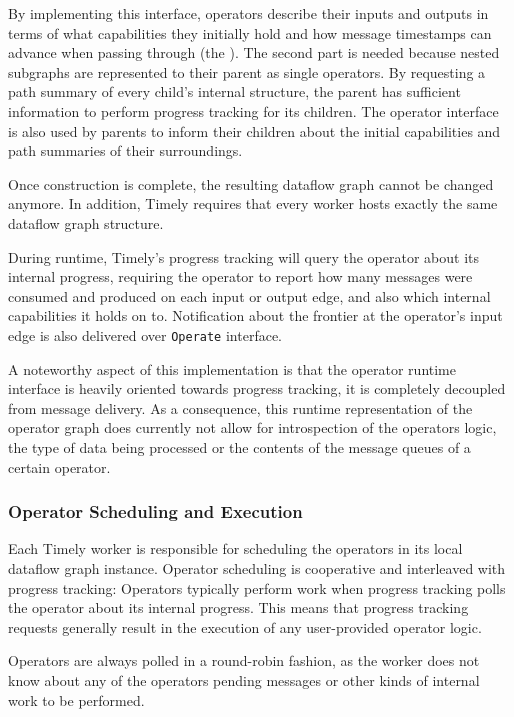 By implementing this interface, operators describe their inputs and
outputs in terms of what capabilities they initially hold and how message
timestamps can advance when passing through (the ).
The second part is needed because nested subgraphs are represented to their
parent as single operators. By requesting a path summary of every child's
internal structure, the parent has sufficient information to perform progress
tracking for its children. The operator interface is also used by parents
to inform their children about the initial capabilities and path summaries
of their surroundings.

Once construction is complete, the resulting dataflow graph cannot be changed anymore.
In addition, Timely requires that every worker hosts exactly the same dataflow graph
structure.

During runtime, Timely's progress tracking will query the operator about its
internal progress, requiring the operator to report how many messages were
consumed and produced on each input or output edge, and also which internal
capabilities it holds on to. Notification about the frontier at the
operator's input edge is also delivered over \lstinline{Operate} interface.

A noteworthy aspect of this implementation is that the operator runtime interface
is heavily oriented towards progress tracking, it is completely decoupled
from message delivery.
As a consequence, this runtime representation of the operator graph does
currently not allow for introspection of the operators logic, the type of data
being processed or the contents of the message queues of a certain operator.

\subsubsection{Operator Scheduling and Execution}

Each Timely worker is responsible for scheduling the operators in its local
dataflow graph instance. Operator scheduling is cooperative and interleaved 
with progress tracking: Operators typically perform work when progress tracking
polls the operator about its internal progress. This means that progress
tracking requests generally result in the execution of any user-provided
operator logic.

Operators are always polled in a round-robin fashion, as the worker does
not know about any of the operators pending messages or other kinds of
internal work to be performed.

